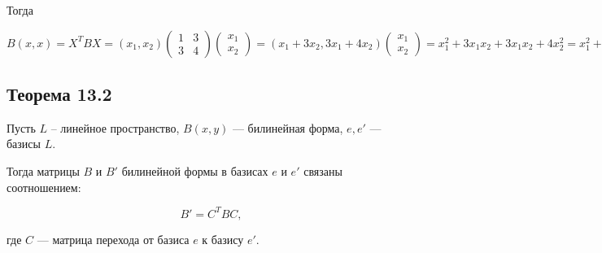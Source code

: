 {Тогда



\[
B(x, x) = X^TBX = (x_1, x_2) \begin{pmatrix} 1 & 3 \\ 3 & 4 \end{pmatrix} \begin{pmatrix} x_1 \\ x_2 \end{pmatrix} = 
(x_1 + 3x_2, 3x_1 + 4x_2) \begin{pmatrix} x_1 \\ x_2 \end{pmatrix} = x_1^2 + 3x_1x_2 + 3x_1x_2 + 4x_2^2 = x_1^2 + 6x_1x_2 + 4x_2^2.
\]


\subsection*{Теорема 13.2}

Пусть \( L \) – линейное пространство, \( B(x, y) \) — билинейная форма, \( e, e' \) — базисы \( L \).

Тогда матрицы \( B \) и \( B' \) билинейной формы в базисах \( e \) и \( e' \) связаны соотношением:



\[
B' = C^T B C,
\]



где \( C \) — матрица перехода от базиса \( e \) к базису \( e' \).



}